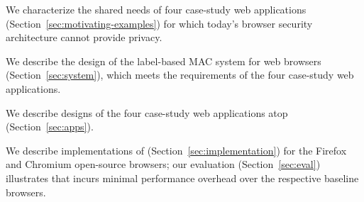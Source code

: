\begin{CompactItemize}
\item We characterize the shared needs of four case-study web applications
  (Section~\ref{sec:motivating-examples}) for which today's browser
  security architecture cannot provide privacy.
\item We describe the design of the \sys{} label-based MAC system
  for web browsers (Section~\ref{sec:system}), which meets the
  requirements of the four case-study web applications.
\item We describe designs of the four case-study web applications atop
  \sys (Section~\ref{sec:apps}).
\item We describe implementations of \sys{}
  (Section~\ref{sec:implementation}) for the Firefox and Chromium
  open-source browsers; our evaluation (Section~\ref{sec:eval})
  illustrates that \sys{} incurs minimal performance overhead over the
  respective baseline browsers.
\end{CompactItemize}

